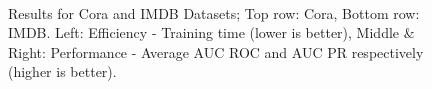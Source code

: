 \documentclass[sigconf]{acmart}
\begin{document}
\begin{figure}[t]
{\label{fig:imdbROC}
}%
%
\\
%
\caption{Results for Cora and IMDB Datasets; Top row: Cora, Bottom row: IMDB. Left: Efficiency - Training time (lower is better), Middle \& Right: Performance - Average AUC ROC and AUC PR respectively (higher is better).}
\label{fig:results2}
\end{figure}
\end{document}
